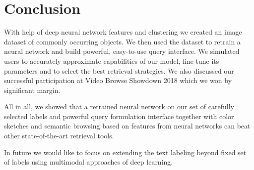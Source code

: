 \chapter*{Conclusion}

With help of deep neural network features and clustering we created an image dataset of commonly occurring objects. We then used the dataset to retrain a neural network and build powerful, easy-to-use query interface. We simulated users to accurately approximate capabilities of our model, fine-tune its parameters and to select the best retrieval strategies. We also discussed our successful participation at Video Browse Showdown 2018 which we won by significant margin.

All in all, we showed that a retrained neural network on our set of carefully selected labels and powerful query formulation interface together with color sketches and semantic browsing based on features from neural networks can beat other state-of-the-art retrieval tools.


In future we would like to focus on extending the text labeling beyond fixed set of labels using multimodal approaches of deep learning.